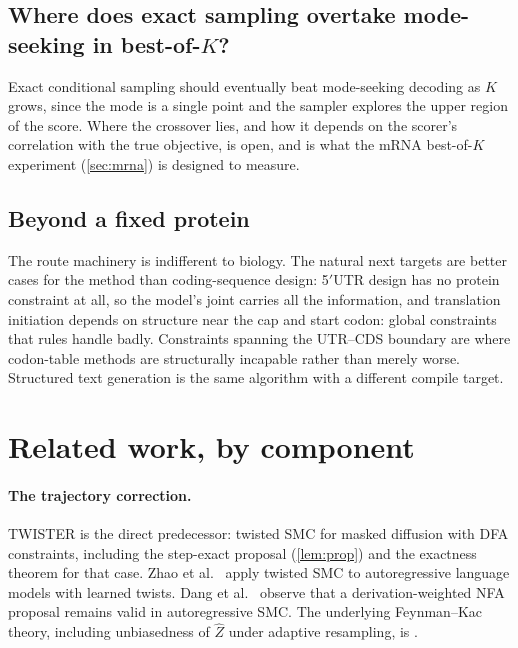 \documentclass[11pt]{article}
\theoremstyle{definition}
\newcommand{\Zh}{\widehat Z}
\begin{document}
\subsection{Where does exact sampling overtake mode-seeking in best-of-$K$?}
Exact conditional sampling should eventually beat mode-seeking decoding as $K$ grows, since the mode is a single
point and the sampler explores the upper region of the score. Where the crossover lies, and how it depends on the
scorer's correlation with the true objective, is open, and is what the mRNA best-of-$K$ experiment
(\cref{sec:mrna}) is designed to measure.

\subsection{Beyond a fixed protein}
The route machinery is indifferent to biology. The natural next targets are better cases for the method than
coding-sequence design: 5$'$UTR design has no protein constraint at all, so the model's joint carries all the
information, and translation initiation depends on structure near the cap and start codon: global constraints
that rules handle badly. Constraints spanning the UTR--CDS boundary are where codon-table methods are
structurally incapable rather than merely worse. Structured text generation is the same algorithm with a
different compile target.

\section{Related work, by component}\label{sec:related}

\paragraph{The trajectory correction.}
TWISTER \cite{twister} is the direct predecessor: twisted SMC for masked diffusion with DFA constraints,
including the step-exact proposal (\cref{lem:prop}) and the exactness theorem for that case. Zhao et al.\
\cite{zhao2024} apply twisted SMC to autoregressive language models with learned twists. Dang et al.\
\cite{dang2026icml} observe that a derivation-weighted NFA proposal remains valid in autoregressive SMC. The
underlying Feynman--Kac theory, including unbiasedness of $\Zh$ under adaptive resampling, is \cite{delmoral2004}.
\end{document}
